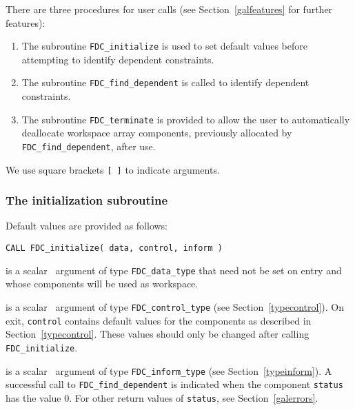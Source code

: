 \documentclass{galahad}
\newcommand{\packagename}{FDC}
\begin{document}

\galarguments
There are three procedures for user calls
(see Section~\ref{galfeatures} for further features):

\begin{enumerate}
\item The subroutine
      {\tt \packagename\_initialize}
      is used to set default values
      before attempting to identify dependent constraints.
\item The subroutine
      {\tt \packagename\_find\_dependent}
      is called to identify dependent constraints.
\item The subroutine
      {\tt \packagename\_terminate}
      is provided to allow the user to automatically deallocate
      workspace array components, previously allocated by
       {\tt \packagename\_find\_dependent}, after use.
\end{enumerate}
We use square brackets {\tt [ ]} to indicate \optional arguments.


\subsubsection{The initialization subroutine}\label{subinit}
 Default values are provided as follows:
\vspace*{1mm}

\hspace{8mm}
{\tt CALL \packagename\_initialize(  data, control, inform )}

\vspace*{1mm}
\begin{description}

 is a scalar \intentinout\ argument of type
{\tt \packagename\_data\_type}
that need not be set on entry and whose components will be used as workspace.

 is a scalar \intentout\ argument of type
{\tt \packagename\_control\_type}
(see Section~\ref{typecontrol}).
On exit, {\tt control} contains default values for the components as
described in Section~\ref{typecontrol}.
These values should only be changed after calling
{\tt \packagename\_initialize}.

 is a scalar \intentinout\ argument of type
{\tt \packagename\_inform\_type}
(see Section~\ref{typeinform}). A successful call to
{\tt \packagename\_find\_dependent}
is indicated when the  component {\tt status} has the value 0.
For other return values of {\tt status}, see Section~\ref{galerrors}.

\end{description}
\end{document}
